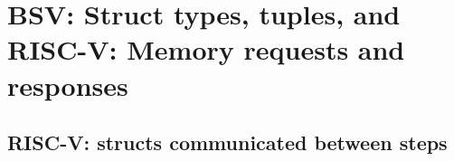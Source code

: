

\chapter{BSV: Struct types, tuples, and\\
RISC-V: Memory requests and responses}


\setcounter{page}{1}
\renewcommand{\thepage}{\arabic{chapter}-\arabic{page}}

\label{ch_Structs_Mem_Reqs_Rsps}


\section{RISC-V: structs communicated between steps}


